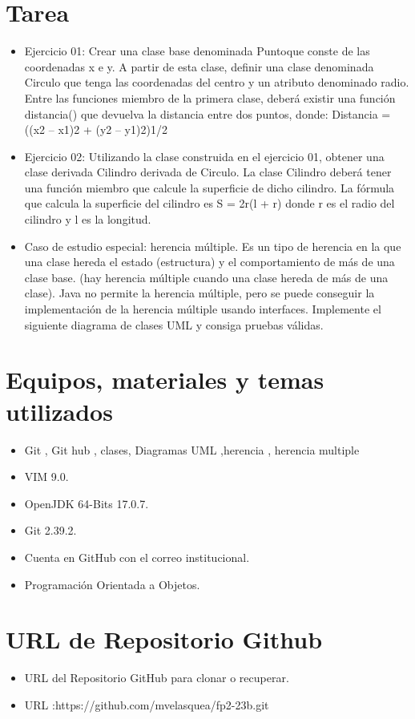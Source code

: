 \documentclass{article}
\begin{document}
	\section{Tarea}
	\begin{itemize}		
		\item Ejercicio 01: Crear una clase base denominada Puntoque conste de las coordenadas x e y. A 
partir de esta clase, definir una clase denominada Circulo que tenga las coordenadas del 
centro y un atributo denominado radio. Entre las funciones miembro de la primera clase, 
deberá existir una función distancia() que devuelva la distancia entre dos puntos, donde:
Distancia = ((x2 – x1)2 + (y2 – y1)2)1/2
		\item Ejercicio 02: Utilizando la clase construida en el ejercicio 01, obtener una clase derivada 
Cilindro derivada de Circulo. La clase Cilindro deberá tener una función miembro que calcule 
la superficie de dicho cilindro. La fórmula que calcula la superficie del cilindro es S = 2r(l + r) 
donde r es el radio del cilindro y l es la longitud.

		\item Caso de estudio especial: herencia múltiple. Es un tipo de herencia en la que una 
clase hereda el estado (estructura) y el comportamiento de más de una clase base. (hay 
herencia múltiple cuando una clase hereda de más de una clase). Java no permite la herencia 
múltiple, pero se puede conseguir la implementación de la herencia múltiple usando 
interfaces. Implemente el siguiente diagrama de clases UML y consiga pruebas válidas.
		\end{itemize}
	\section{Equipos, materiales y temas utilizados}
	\begin{itemize}
		\item Git , Git hub , clases, Diagramas UML ,herencia , herencia multiple
		\item VIM 9.0.
		\item OpenJDK 64-Bits 17.0.7.
		\item Git 2.39.2.
		\item Cuenta en GitHub con el correo institucional.
		\item Programación Orientada a Objetos.
	\end{itemize}
	
	\section{URL de Repositorio Github}
	\begin{itemize}
		\item URL del Repositorio GitHub para clonar o recuperar.
			\item URL :https://github.com/mvelasquea/fp2-23b.git

	\end{itemize}
	
\end{document}
